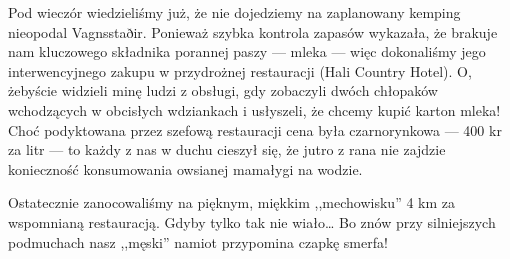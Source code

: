 Pod wieczór wiedzieliśmy już, że nie dojedziemy na zaplanowany kemping nieopodal Vagnsstaðir. Ponieważ szybka kontrola zapasów wykazała, że brakuje nam kluczowego składnika porannej paszy --- mleka --- więc dokonaliśmy jego interwencyjnego zakupu w przydrożnej restauracji (Hali Country Hotel). O, żebyście widzieli minę ludzi z obsługi, gdy zobaczyli dwóch chłopaków
wchodzących w obcisłych wdziankach i usłyszeli, że chcemy kupić karton mleka! Choć podyktowana przez szefową restauracji cena była czarnorynkowa --- 400 kr za litr --- to każdy z nas w duchu cieszył się, że jutro z rana nie zajdzie konieczność konsumowania owsianej mamałygi na wodzie.

Ostatecznie zanocowaliśmy na pięknym, miękkim ,,mechowisku'' 4 km za wspomnianą restauracją. Gdyby tylko tak nie wiało… Bo znów przy silniejszych podmuchach nasz ,,męski'' namiot przypomina czapkę smerfa!